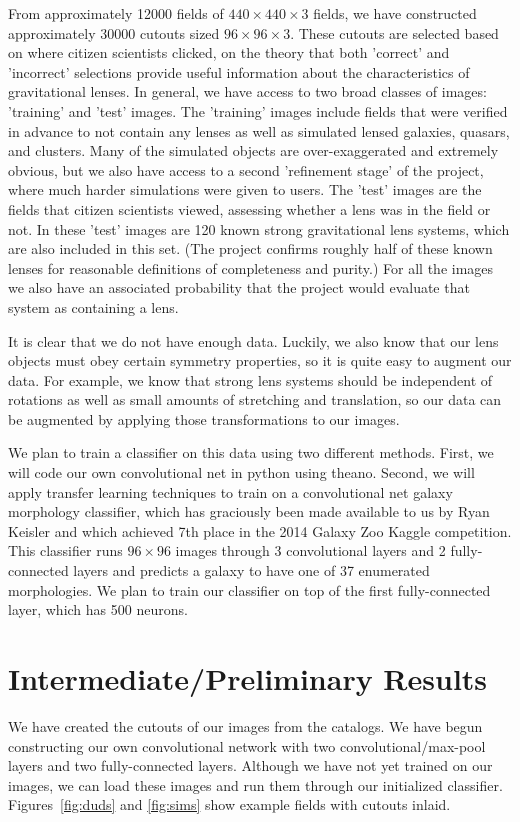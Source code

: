 \documentclass[10pt,twocolumn,letterpaper]{article}
\begin{document}
From approximately 12000 fields of $440\times440\times3$ fields, we have
constructed approximately 30000 cutouts sized $96\times96\times3$. These cutouts
are selected based on where citizen scientists clicked, on the theory that both
'correct' and 'incorrect' selections provide useful information about the
characteristics of gravitational lenses. In general, we have access to two
broad classes of images: 'training' and 'test' images. The 'training' images
include fields that were verified in advance to not contain any lenses as well
as simulated lensed galaxies, quasars, and clusters. Many of the simulated
objects are over-exaggerated and extremely obvious, but we also have access to
a second 'refinement stage' of the project, where much harder simulations were
given to users. The 'test' images are the fields that citizen scientists
viewed, assessing whether a lens was in the field or not. In these 'test'
images are 120 known strong gravitational lens systems, which are also included
in this set. (The project confirms roughly half of these known lenses for
reasonable definitions of completeness and purity.) For all the images we also
have an associated probability that the project would evaluate that system as
containing a lens.

It is clear that we do not have enough data. Luckily, we also know that our
lens objects must obey certain symmetry properties, so it is quite easy to
augment our data. For example, we know that strong lens systems should be
independent of rotations as well as small amounts of stretching and
translation, so our data can be augmented by applying those transformations to
our images.

We plan to train a classifier on this data using two different methods. First,
we will code our own convolutional net in python using theano. Second, we will
apply transfer learning techniques to train on a convolutional net galaxy
morphology classifier, which has graciously been made available to us by Ryan
Keisler and which achieved 7th place in the 2014 Galaxy Zoo Kaggle competition.
This classifier runs $96\times96$ images through 3 convolutional layers and 2
fully-connected layers and predicts a galaxy to have one of 37 enumerated
morphologies. We plan to train our classifier on top of the first
fully-connected layer, which has 500 neurons.


\section{Intermediate/Preliminary Results}

We have created the cutouts of our images from the catalogs.
We have begun constructing our own convolutional network with two
convolutional/max-pool layers and two fully-connected layers. Although we have
not yet trained on our images, we can load these images and run them
through our initialized classifier. Figures~\ref{fig:duds} and
\ref{fig:sims}\xspace show example fields with cutouts inlaid.

% 
% 
\end{document}
